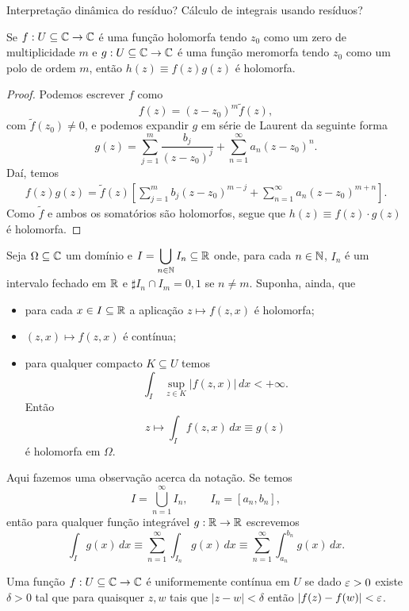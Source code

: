 Interpretação dinâmica do resíduo?
Cálculo de integrais usando resíduos?
%
\begin{lema}
\label{lema-zeros-vezes-polos}
Se $f:U\subseteq\mathbb{C}\to\mathbb{C}$ é uma função holomorfa tendo $z_0$ como um zero de multiplicidade
$m$ e $g:U\subseteq\mathbb{C}\to\mathbb{C}$ é uma função meromorfa tendo $z_0$ como um polo de ordem $m$, então
$h(z) \equiv f(z)g(z)$ é holomorfa.
\end{lema}
%
\begin{proof}
Podemos escrever $f$ como
%
\[
f(z) = (z - z_0)^m \widetilde{f}(z),
\]
%
com $\widetilde{f}(z_0) \neq 0$, e podemos expandir $g$ em série de Laurent da seguinte
forma
%
\[
g(z) = \sum_{j=1}^m \frac{b_j}{(z - z_0)^j} + \sum_{n=1}^{\infty} a_n (z - z_0)^n.
\]
%
Daí, temos
%
\begin{align*}
    f(z)g(z) = \widetilde{f}(z)
    \left[ \sum_{j=1}^m b_j (z - z_0)^{m-j} + \sum_{n=1}^{\infty} a_n (z - z_0)^{m+n} \right].
\end{align*}
%
Como $\widetilde{f}$ e ambos os somatórios são holomorfos, segue que $h(z) \equiv f(z) \cdot g(z)$ é 
holomorfa.
\end{proof}
%
\begin{teorema}
Seja $\Omega\subseteq\mathbb{C}$ um domínio e $I = \displaystyle{\bigcup_{n\in\mathbb{N}} I_n} \subseteq\mathbb{R}$ onde,
para cada $n\in\mathbb{N}$, $I_n$ é um intervalo fechado em $\mathbb{R}$ e $\sharp I_n \cap I_m = 0, 1$ se
$n\neq m$. Suponha, ainda, que
%
\begin{itemize}
    \item para cada $x\in I\subseteq\mathbb{R}$ a aplicação 
    $z\longmapsto f(z,x)$ é holomorfa;
    \item $(z,x) \longmapsto f(z,x)$ é contínua;
    \item para qualquer compacto $K\subseteq U$ temos
    \[
    \int_I\, \sup_{z\in K} |f(z,x)| \, dx < +\infty.
    \]
    Então
    \[
    z \longmapsto \int_I f(z,x) \, dx \equiv g(z)
    \]
    é holomorfa em $\Omega$.
\end{itemize}
%
\end{teorema}
%
Aqui fazemos uma observação acerca da notação. Se temos
%
\[
I = \bigcup_{n=1}^{\infty} I_n, \qquad I_n = [a_n, b_n],
\]
%
então para qualquer função integrável $g:\mathbb{R}\to\mathbb{R}$ escrevemos
%
\[
\int_I g(x) \, dx 
\equiv \sum_{n=1}^{\infty} \int_{I_n} g(x) \, dx 
\equiv \sum_{n=1}^{\infty} \int_{a_n}^{b_n} g(x) \, dx.
\]
%
\begin{definicao}
\label{def-cont-unif}
Uma função $f:U\subseteq\mathbb{C}\to\mathbb{C}$ é uniformemente contínua em $U$ se dado $\varepsilon > 0$
existe $\delta > 0$ tal que para quaisquer $z,w$ tais que $|z-w| < \delta$ então
$|f(z) - f(w)| < \varepsilon$.
\end{definicao}
